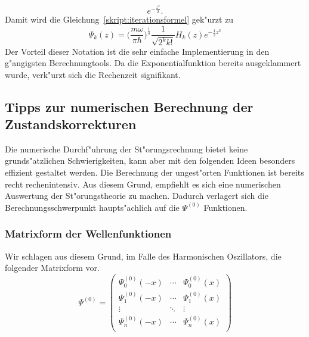 \begin{refsection}
\[e^{-\frac{z^2}2}.
\]
Damit wird die Gleichung~\ref{skript:iterationsformel} gek"urzt zu
\begin{equation}
\Psi_k(z)
=
\biggl(\frac{m\omega}{\pi\hbar}\biggr)^\frac14
\frac1{\sqrt{2^k k!}}H_k(z)
e^{-\frac12 z^2}
\end{equation}
Der Vorteil dieser Notation ist die sehr einfache Implementierung
in den g"angigsten Berechnungtools.
Da die Exponentialfunktion bereits ausgeklammert wurde, verk"urzt sich die Rechenzeit
signifikant.
\subsection{Tipps zur numerischen Berechnung der Zustandskorrekturen}
Die numerische Durchf"uhrung der St"orungsrechnung bietet keine grunds"atzlichen 
Schwierigkeiten, kann aber mit den folgenden Ideen besonders effizient 
gestaltet werden.
Die Berechnung der ungest"orten Funktionen ist bereits recht rechenintensiv.
Aus diesem Grund,
empfiehlt es sich eine numerischen Auswertung der St"orungstheorie zu machen.
Dadurch verlagert sich die Berechnungsschwerpunkt
haupts"achlich auf die $\Psi^{(0)}$ Funktionen.
\subsubsection{Matrixform der Wellenfunktionen}
Wir schlagen aus diesem Grund,
im Falle des Harmonischen Oszillators, die folgender Matrixform vor.
\[
\Psi^{(0)}
=
\begin{pmatrix}
\Psi_0^{(0)}(-x) & \cdots & \Psi_0^{(0)}(x)	\\
\Psi_1^{(0)}(-x) & \cdots & \Psi_1^{(0)}(x)	\\
\vdots & \ddots & \vdots			\\
\Psi_n^{(0)}(-x) & \cdots & \Psi_n^{(0)}(x)	\\
\end{pmatrix}
\]

\end{refsection}
